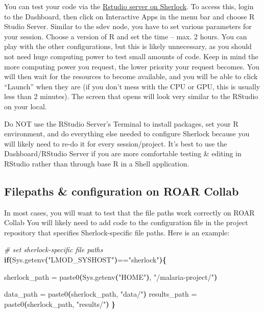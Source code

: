 \documentclass[
]{book}
\newenvironment{Shaded}{\begin{snugshade}}{\end{snugshade}}
\newcommand{\CommentTok}[1]{\textcolor[rgb]{0.56,0.35,0.01}{\textit{#1}}}
\newcommand{\ControlFlowTok}[1]{\textcolor[rgb]{0.13,0.29,0.53}{\textbf{#1}}}
\newcommand{\ErrorTok}[1]{\textcolor[rgb]{0.64,0.00,0.00}{\textbf{#1}}}
\newcommand{\ExtensionTok}[1]{#1}
\newcommand{\KeywordTok}[1]{\textcolor[rgb]{0.13,0.29,0.53}{\textbf{#1}}}
\newcommand{\NormalTok}[1]{#1}
\newcommand{\StringTok}[1]{\textcolor[rgb]{0.31,0.60,0.02}{#1}}
\begin{document}
You can test your code via the \href{https://www.sherlock.stanford.edu/docs/user-guide/ondemand/\#rstudio}{Rstudio server on Sherlock}. To access this, login to the Dashboard, then click on Interactive Apps in the menu bar and choose R Studio Server. Similar to the sdev node, you have to set various parameters for your session. Choose a version of R and set the time -- max. 2 hours. You can play with the other configurations, but this is likely unnecessary, as you should not need huge computing power to test small amounts of code. Keep in mind the more computing power you request, the lower priority your request becomes. You will then wait for the resources to become available, and you will be able to click ``Launch'' when they are (if you don't mess with the CPU or GPU, this is usually less than 2 minutes). The screen that opens will look very similar to the RStudio on your local.

Do NOT use the RStudio Server's Terminal to install packages, set your R environment, and do everything else needed to configure Sherlock because you will likely need to re-do it for every session/project. It's best to use the Dashboard/RStudio Server if you are more comfortable testing \& editing in RStudio rather than through base R in a Shell application.

\subsection{Filepaths \& configuration on ROAR Collab}\label{filepaths-configuration-on-roar-collab}

In most cases, you will want to test that the file paths work correctly on ROAR Collab You will likely need to add code to the configuration file in the project repository that specifies Sherlock-specific file paths. Here is an example:

\begin{Shaded}
\begin{Highlighting}[]
\CommentTok{\# set sherlock{-}specific file paths}
\ControlFlowTok{if}\KeywordTok{(}\ExtensionTok{Sys.getenv}\ErrorTok{(}\StringTok{"LMOD\_SYSHOST"}\KeywordTok{)}\ExtensionTok{==}\StringTok{"sherlock"}\KeywordTok{)\{}
  
  \ExtensionTok{sherlock\_path}\NormalTok{ = paste0}\ErrorTok{(}\ExtensionTok{Sys.getenv}\ErrorTok{(}\StringTok{"HOME"}\KeywordTok{)}\ExtensionTok{,} \StringTok{"/malaria{-}project/"}\KeywordTok{)}
  
  \ExtensionTok{data\_path}\NormalTok{ = paste0}\ErrorTok{(}\ExtensionTok{sherlock\_path,} \StringTok{"data/"}\KeywordTok{)}
  \ExtensionTok{results\_path}\NormalTok{ = paste0}\ErrorTok{(}\ExtensionTok{sherlock\_path,} \StringTok{"results/"}\KeywordTok{)}
\KeywordTok{\}}
\end{Highlighting}
\end{Shaded}
\end{document}

